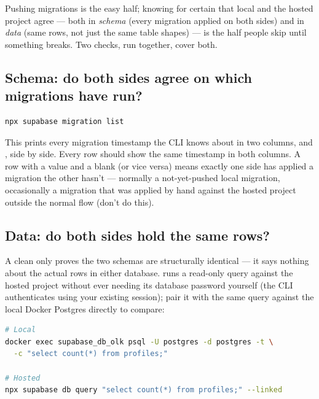 Pushing migrations is the easy half; knowing for certain that local and the hosted project agree — both in \emph{schema} (every migration applied on both sides) and in \emph{data} (same rows, not just the same table shapes) — is the half people skip until something breaks. Two checks, run together, cover both.

\subsection{Schema: do both sides agree on which migrations have run?}

\begin{lstlisting}[style=olkcodebash, language=bash, caption={Compares local migration files against the hosted project's applied history}]
npx supabase migration list
\end{lstlisting}

This prints every migration timestamp the CLI knows about in two columns,  and , side by side. Every row should show the same timestamp in both columns. A row with a  value and a blank  (or vice versa) means exactly one side has applied a migration the other hasn't — normally a not-yet-pushed local migration, occasionally a migration that was applied by hand against the hosted project outside the normal  flow (don't do this).

\subsection{Data: do both sides hold the same rows?}

A clean  only proves the two schemas are structurally identical — it says nothing about the actual rows in either database.  runs a read-only query against the hosted project without ever needing its database password yourself (the CLI authenticates using your existing  session); pair it with the same query against the local Docker Postgres directly to compare:

\begin{lstlisting}[style=olkcodebash, language=bash, caption={Row-count comparison — repeat per table, or script over all of them}]
# Local
docker exec supabase_db_olk psql -U postgres -d postgres -t \
  -c "select count(*) from profiles;"

# Hosted
npx supabase db query "select count(*) from profiles;" --linked
\end{lstlisting}

